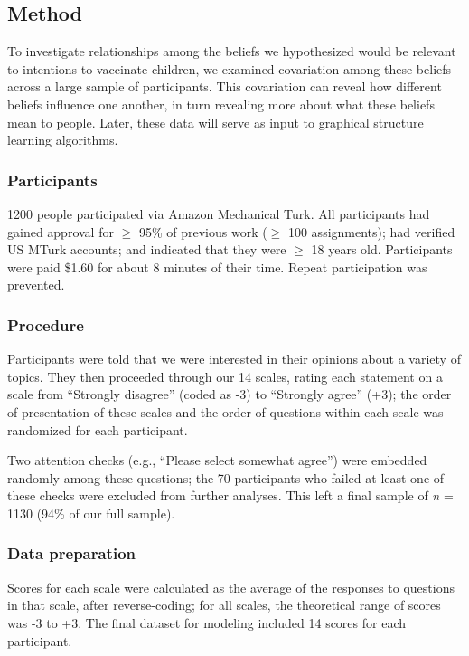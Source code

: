 \documentclass[10pt, letterpaper]{article}
\begin{document}
\subsection{Method}\label{method}

To investigate relationships among the beliefs we hypothesized would be
relevant to intentions to vaccinate children, we examined covariation
among these beliefs across a large sample of participants. This
covariation can reveal how different beliefs influence one another, in
turn revealing more about what these beliefs mean to people. Later,
these data will serve as input to graphical structure learning
algorithms.

\subsubsection{Participants}\label{participants}

1200 people participated via Amazon Mechanical Turk. All participants
had gained approval for \(\geq\) 95\% of previous work (\(\geq\) 100
assignments); had verified US MTurk accounts; and indicated that they
were \(\geq\) 18 years old. Participants were paid \$1.60 for about 8
minutes of their time. Repeat participation was prevented.

\subsubsection{Procedure}\label{procedure}

Participants were told that we were interested in their opinions about a
variety of topics. They then proceeded through our 14 scales, rating
each statement on a scale from ``Strongly disagree'' (coded as -3) to
``Strongly agree'' (+3); the order of presentation of these scales and
the order of questions within each scale was randomized for each
participant.

Two attention checks (e.g., ``Please select somewhat agree'') were
embedded randomly among these questions; the 70 participants who failed
at least one of these checks were excluded from further analyses. This
left a final sample of \emph{n} = 1130 (94\% of our full sample).

\subsubsection{Data preparation}\label{data-preparation}

Scores for each scale were calculated as the average of the responses to
questions in that scale, after reverse-coding; for all scales, the
theoretical range of scores was -3 to +3. The final dataset for modeling
included 14 scores for each participant.
\end{document}
